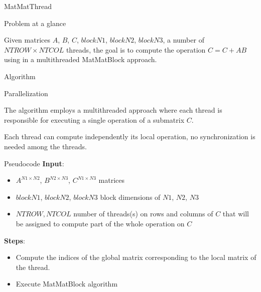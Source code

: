 \begin{chapter}{MatMatThread}
    \begin{section}{Problem at a glance}
        \par Given matrices $A$, $B$, $C$, $blockN1$, $blockN2$, $blockN3$, a number of $NTROW \times NTCOL$ threads, the goal is to compute the  operation $C = C + AB$ using  in a multithreaded MatMatBlock approach.
    \end{section}
    \begin{section}{Algorithm}
        \begin{subsection}{Parallelization}
            \par The algorithm employs a multithreaded approach where each thread is responsible for executing a single  operation of a submatrix $C$.
            \par Each thread can compute independently its local  operation, no synchronization is needed among the threads.
        \end{subsection}
        \begin{subsection}{Pseudocode}
            \textbf{Input}:
            \begin{itemize}
                \item $A^{N1 \times N2}$, $B^{N2 \times N3}$, $C^{N1 \times N3}$ matrices
                \item $blockN1$, $blockN2$, $blockN3$ block dimensions of $N1$, $N2$, $N3$
                \item $NTROW, NTCOL$ number of threads(s) on rows and columns of $C$ that will be assigned to compute part of the whole  operation on $C$
            \end{itemize}
            \textbf{Steps}:
            \begin{itemize}
                \item Compute the indices of the global matrix corresponding to the local matrix of the thread.
                \item Execute MatMatBlock algorithm
            \end{itemize}
            
        \end{subsection}
        \begin{figure}[ht]
            \centering
            
            \label{fig:matmatthread}
        \end{figure}

\end{section}
\end{chapter}
